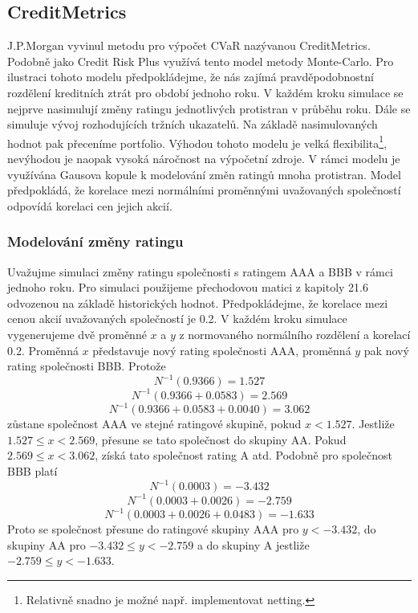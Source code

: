 \documentclass[a4paper]{book}
\begin{document}
\subsection{CreditMetrics}

J.P.Morgan vyvinul metodu pro výpočet CVaR nazývanou CreditMetrics. Podobně jako Credit Risk Plus využívá tento model metody Monte-Carlo. Pro ilustraci tohoto modelu předpokládejme, že nás zajímá pravděpodobnostní rozdělení kreditních ztrát pro období jednoho roku. V každém kroku simulace se nejprve nasimulují změny ratingu jednotlivých protistran v průběhu roku. Dále se simuluje vývoj rozhodujících tržních ukazatelů. Na základě nasimulovaných hodnot pak přeceníme portfolio. Výhodou tohoto modelu je velká flexibilita\footnote{Relativně snadno je možné např. implementovat netting.}, nevýhodou je naopak vysoká náročnost na výpočetní zdroje. V rámci modelu je využívána Gausova kopule k modelování změn ratingů mnoha protistran. Model předpokládá, že korelace mezi normálními proměnnými uvažovaných společností odpovídá korelaci cen jejich akcií.

\subsubsection{Modelování změny ratingu}

Uvažujme simulaci změny ratingu společnosti s ratingem AAA a BBB v rámci jednoho roku. Pro simulaci použijeme přechodovou matici z kapitoly 21.6 odvozenou na základě historických hodnot. Předpokládejme, že korelace mezi cenou akcií uvažovaných společností je 0.2. V každém kroku simulace vygenerujeme dvě proměnné $x$ a $y$ z normovaného normálního rozdělení a korelací 0.2. Proměnná $x$ představuje nový rating společnosti AAA, proměnná $y$ pak nový rating společnosti BBB. Protože
\begin{equation*}
N^{-1}(0.9366) = 1.527
\end{equation*} 
\begin{equation*}
N^{-1}(0.9366 + 0.0583) = 2.569
\end{equation*}
\begin{equation*}
N^{-1}(0.9366 + 0.0583 + 0.0040) = 3.062
\end{equation*}
zůstane společnost AAA ve stejné ratingové skupině, pokud $x < 1.527$. Jestliže $1.527 \le x < 2.569$, přesune se tato společnost do skupiny AA. Pokud $2.569 \le x < 3.062$, získá tato společnost rating A atd. Podobně pro společnost BBB platí
\begin{equation*}
N^{-1}(0.0003) = -3.432
\end{equation*} 
\begin{equation*}
N^{-1}(0.0003 + 0.0026) = -2.759
\end{equation*}
\begin{equation*}
N^{-1}(0.0003 + 0.0026 + 0.0483) = -1.633
\end{equation*}
Proto se společnost přesune do ratingové skupiny AAA pro $y < -3.432$, do skupiny AA pro $-3.432 \le y < -2.759$ a do skupiny A jestliže $-2.759 \le y < -1.633$.
\end{document}
